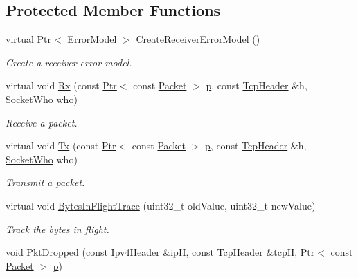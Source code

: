 \subsection*{Protected Member Functions}
\begin{DoxyCompactItemize}
\item 
virtual \hyperlink{classns3_1_1Ptr}{Ptr}$<$ \hyperlink{classns3_1_1ErrorModel}{Error\+Model} $>$ \hyperlink{classTcpBytesInFlightTest_a1942203532d11a2136fe0369fd7385fc}{Create\+Receiver\+Error\+Model} ()
\begin{DoxyCompactList}\small\item\em Create a receiver error model. \end{DoxyCompactList}\item 
virtual void \hyperlink{classTcpBytesInFlightTest_acad5e29de044d21893d2184584600ae5}{Rx} (const \hyperlink{classns3_1_1Ptr}{Ptr}$<$ const \hyperlink{classns3_1_1Packet}{Packet} $>$ \hyperlink{lte__link__budget__x2__handover__measures_8m_ac9de518908a968428863f829398a4e62}{p}, const \hyperlink{classns3_1_1TcpHeader}{Tcp\+Header} \&h, \hyperlink{classns3_1_1TcpGeneralTest_a29338e6b7137cad650c2ff835713f6ee}{Socket\+Who} who)
\begin{DoxyCompactList}\small\item\em Receive a packet. \end{DoxyCompactList}\item 
virtual void \hyperlink{classTcpBytesInFlightTest_a37c2f7368197bb44614a58e577929f3b}{Tx} (const \hyperlink{classns3_1_1Ptr}{Ptr}$<$ const \hyperlink{classns3_1_1Packet}{Packet} $>$ \hyperlink{lte__link__budget__x2__handover__measures_8m_ac9de518908a968428863f829398a4e62}{p}, const \hyperlink{classns3_1_1TcpHeader}{Tcp\+Header} \&h, \hyperlink{classns3_1_1TcpGeneralTest_a29338e6b7137cad650c2ff835713f6ee}{Socket\+Who} who)
\begin{DoxyCompactList}\small\item\em Transmit a packet. \end{DoxyCompactList}\item 
virtual void \hyperlink{classTcpBytesInFlightTest_a916289d6366ede554cc78f9c706c6e56}{Bytes\+In\+Flight\+Trace} (uint32\+\_\+t old\+Value, uint32\+\_\+t new\+Value)
\begin{DoxyCompactList}\small\item\em Track the bytes in flight. \end{DoxyCompactList}\item 
void \hyperlink{classTcpBytesInFlightTest_a8f1210443f618fcb98db05c47b992b4d}{Pkt\+Dropped} (const \hyperlink{classns3_1_1Ipv4Header}{Ipv4\+Header} \&ipH, const \hyperlink{classns3_1_1TcpHeader}{Tcp\+Header} \&tcpH, \hyperlink{classns3_1_1Ptr}{Ptr}$<$ const \hyperlink{classns3_1_1Packet}{Packet} $>$ \hyperlink{lte__link__budget__x2__handover__measures_8m_ac9de518908a968428863f829398a4e62}{p})

\end{DoxyCompactItemize}
